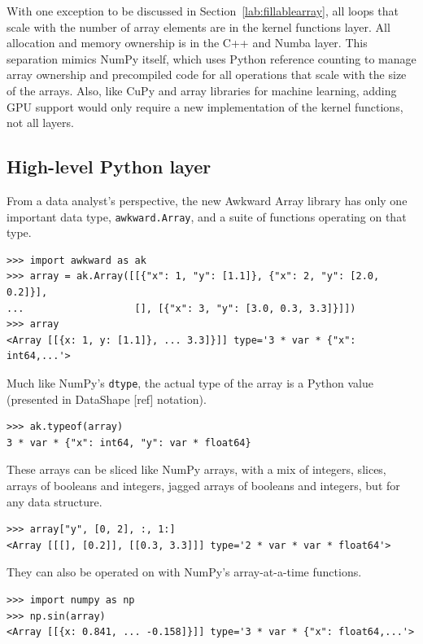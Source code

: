 \documentclass{webofc}
\begin{document}
\noindent With one exception to be discussed in Section~\ref{lab:fillablearray}, all loops that scale with the number of array elements are in the kernel functions layer. All allocation and memory ownership is in the C++ and Numba layer. This separation mimics NumPy itself, which uses Python reference counting to manage array ownership and precompiled code for all operations that scale with the size of the arrays. Also, like CuPy and array libraries for machine learning, adding GPU support would only require a new implementation of the kernel functions, not all layers.

\subsection{High-level Python layer}
\label{lab:high-level}

From a data analyst's perspective, the new Awkward Array library has only one important data type, \texttt{awkward.Array}, and a suite of functions operating on that type.

\begin{verbatim}
>>> import awkward as ak
>>> array = ak.Array([[{"x": 1, "y": [1.1]}, {"x": 2, "y": [2.0, 0.2]}],
...                   [], [{"x": 3, "y": [3.0, 0.3, 3.3]}]])
>>> array
<Array [[{x: 1, y: [1.1]}, ... 3.3]}]] type='3 * var * {"x": int64,...'>
\end{verbatim}

\noindent Much like NumPy's \texttt{dtype}, the actual type of the array is a Python value (presented in DataShape [ref] notation).

\begin{verbatim}
>>> ak.typeof(array)
3 * var * {"x": int64, "y": var * float64}
\end{verbatim}

\noindent These arrays can be sliced like NumPy arrays, with a mix of integers, slices, arrays of booleans and integers, jagged arrays of booleans and integers, but for any data structure.

\begin{verbatim}
>>> array["y", [0, 2], :, 1:]
<Array [[[], [0.2]], [[0.3, 3.3]]] type='2 * var * var * float64'>
\end{verbatim}

\noindent They can also be operated on with NumPy's array-at-a-time functions.

\begin{verbatim}
>>> import numpy as np
>>> np.sin(array)
<Array [[{x: 0.841, ... -0.158]}]] type='3 * var * {"x": float64,...'>
\end{verbatim}
\end{document}
